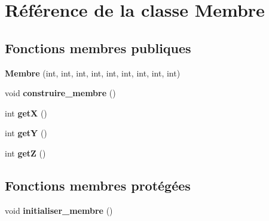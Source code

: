 \hypertarget{classMembre}{\section{Référence de la classe Membre}
\label{classMembre}
}
\subsection*{Fonctions membres publiques}
\begin{DoxyCompactItemize}
\item 
\hypertarget{classMembre_aa6aef46a2d6c52f78a92d907f5456c3c}{{\bfseries Membre} (int, int, int, int, int, int, int, int, int)}\label{classMembre_aa6aef46a2d6c52f78a92d907f5456c3c}

\item 
\hypertarget{classMembre_aac479ed1be4d8439d91361f2cf406274}{void {\bfseries construire\-\_\-membre} ()}\label{classMembre_aac479ed1be4d8439d91361f2cf406274}

\item 
\hypertarget{classMembre_a8f12ab3b7c4f94e759bb8b1e5a86ebde}{int {\bfseries get\-X} ()}\label{classMembre_a8f12ab3b7c4f94e759bb8b1e5a86ebde}

\item 
\hypertarget{classMembre_a90ea50771ad39377e1f0cd398cdc804c}{int {\bfseries get\-Y} ()}\label{classMembre_a90ea50771ad39377e1f0cd398cdc804c}

\item 
\hypertarget{classMembre_aa343eb2632eaa24fe476eb86376fb0b8}{int {\bfseries get\-Z} ()}\label{classMembre_aa343eb2632eaa24fe476eb86376fb0b8}

\end{DoxyCompactItemize}
\subsection*{Fonctions membres protégées}
\begin{DoxyCompactItemize}
\item 
\hypertarget{classMembre_aa087f4c8a5338863f038e17dbcdcdd3e}{void {\bfseries initialiser\-\_\-membre} ()}\label{classMembre_aa087f4c8a5338863f038e17dbcdcdd3e}

\end{DoxyCompactItemize}
